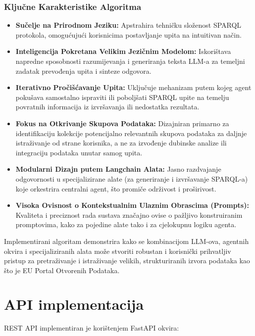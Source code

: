 \subsubsection{Ključne Karakteristike Algoritma}
\label{sec:llm_agent_characteristics_sparql}
\begin{itemize}
    \item \textbf{Sučelje na Prirodnom Jeziku:} Apstrahira tehničku složenost SPARQL protokola, omogućujući korisnicima postavljanje upita na intuitivan način.
    \item \textbf{Inteligencija Pokretana Velikim Jezičnim Modelom:} Iskorištava napredne sposobnosti razumijevanja i generiranja teksta LLM-a za temeljni zadatak prevođenja upita i sinteze odgovora.
    \item \textbf{Iterativno Pročišćavanje Upita:} Uključuje mehanizam putem kojeg agent pokušava samostalno ispraviti ili poboljšati SPARQL upite na temelju povratnih informacija iz izvršavanja ili nedostatka rezultata.
    \item \textbf{Fokus na Otkrivanje Skupova Podataka:} Dizajniran primarno za identifikaciju kolekcije potencijalno relevantnih skupova podataka za daljnje istraživanje od strane korisnika, a ne za izvođenje dubinske analize ili integraciju podataka unutar samog upita.
    \item \textbf{Modularni Dizajn putem Langchain Alata:} Jasno razdvajanje odgovornosti u specijalizirane alate (za generiranje i izvršavanje SPARQL-a) koje orkestrira centralni agent, što promiče održivost i proširivost.
    \item \textbf{Visoka Ovisnost o Kontekstualnim Ulaznim Obrascima (Prompts):} Kvaliteta i preciznost rada sustava značajno ovise o pažljivo konstruiranim promptovima, kako za pojedine alate tako i za cjelokupnu logiku agenta.
\end{itemize}

Implementirani algoritam demonstrira kako se kombinacijom LLM-ova, agentnih okvira i specijaliziranih alata može stvoriti robustan i korisnički prihvatljiv pristup za pretraživanje i istraživanje velikih, strukturiranih izvora podataka kao što je EU Portal Otvorenih Podataka.

\section{API implementacija}
\label{sec:api}

REST API implementiran je korištenjem FastAPI okvira:

